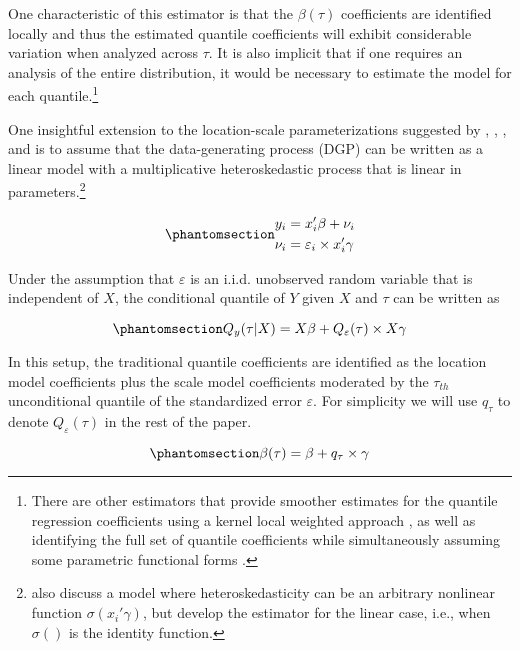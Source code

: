 \documentclass[
  12pt,
  oneside]{article}
\begin{document}
One characteristic of this estimator is that the \(\beta(\tau)\)
coefficients are identified locally and thus the estimated quantile
coefficients will exhibit considerable variation when analyzed across
\(\tau\). It is also implicit that if one requires an analysis of the
entire distribution, it would be necessary to estimate the model for
each quantile.\footnote{There are other estimators that provide smoother
  estimates for the quantile regression coefficients using a kernel
  local weighted approach \citep{kaplan2017}, as well as identifying the
  full set of quantile coefficients while simultaneously assuming some
  parametric functional forms \citep{frumentobotai2016}.}

One insightful extension to the location-scale parameterizations
suggested by \citet{he1997}, \citet{zhao2000}, \citet{cameron2005}, and
\citet{mss2019} is to assume that the data-generating process (DGP) can
be written as a linear model with a multiplicative heteroskedastic
process that is linear in parameters.\footnote{\citet{mss2019} also
  discuss a model where heteroskedasticity can be an arbitrary nonlinear
  function \(\sigma(x_i'\gamma)\), but develop the estimator for the
  linear case, i.e., when \(\sigma()\) is the identity function.}

\begin{equation}\phantomsection\label{eq-eq4}{\begin{aligned}
y_i &=x_i'\beta+\nu_i \\
\nu_i &=\varepsilon_i \times x_i'\gamma 
\end{aligned}
}\end{equation}

Under the assumption that \(\varepsilon\) is an i.i.d. unobserved random
variable that is independent of \(X\), the conditional quantile of \(Y\)
given \(X\) and \(\tau\) can be written as

\begin{equation}\phantomsection\label{eq-eq5}{Q_y(\tau|X) =X\beta+Q_\varepsilon(\tau) \times X\gamma 
}\end{equation}

In this setup, the traditional quantile coefficients are identified as
the location model coefficients plus the scale model coefficients
moderated by the \(\tau_{th}\) unconditional quantile of the
standardized error \(\varepsilon\). For simplicity we will use
\(q_\tau\) to denote \(Q_\varepsilon(\tau)\) in the rest of the paper.

\begin{equation}\phantomsection\label{eq-eq6}{\beta(\tau) = \beta + q_\tau \times \gamma 
}\end{equation}
\end{document}
